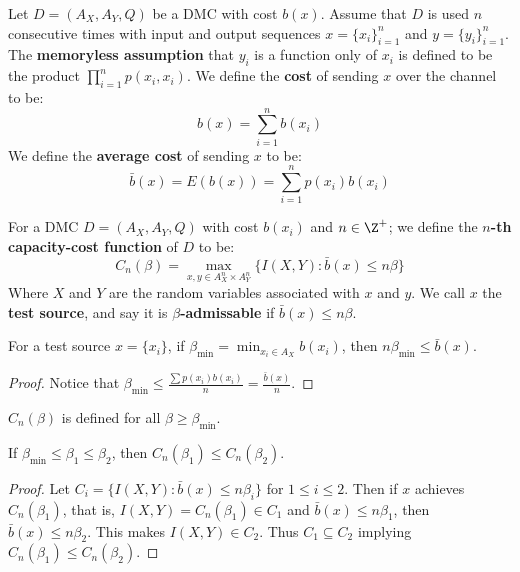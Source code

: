 \begin{definition}
    Let $D=(A_X,A_Y,Q)$ be a DMC with cost $b(x)$. Assume that $D$ is used  $n$
    consecutive times with input and output sequences  $x=\{x_i\}_{i=1}^n$ and
    $y=\{y_i\}_{i=1}^n$. The \textbf{memoryless assumption} that $y_i$ is a
    function only of  $x_i$ is defined to be the product
    $\prod_{i=1}^n{p(x_i,x_i)}$. We define the \textbf{cost} of sending $x$ over
    the channel to  be:
    \begin{equation}
        b(x)=\sum_{i=1}^n{b(x_i)}
    \end{equation}
    We define the \textbf{average cost} of sending $x$ to be:
    \begin{equation}
        \bar{b}(x)=E(b(x))=\sum_{i=1}^n{p(x_i)b(x_i)}
    \end{equation}
\end{definition}

\begin{definition}
    For a DMC $D=(A_X,A_Y,Q)$ with cost $b(x_i)$ and $n \in \Z^+$; we define the
     \textbf{$n$-th capacity-cost function} of $D$ to be:
     \begin{equation}
         C_n(\beta)=\max_{x,y \in A_X^n \times A_Y^n}{\{I(X,Y) : \bar{b}(x)\leq
         n\beta\}}
     \end{equation}
     Where $X$ and  $Y$ are the random variables associated with  $x$ and  $y$.
     We call $x$ the \textbf{test source}, and say it is
     \textbf{$\beta$-admissable} if $\bar{b}(x) \leq n\beta$.
\end{definition}

\begin{lemma}\label{3.1.1}
    For a test source $x=\{x_i\}$, if $\beta_{\min}=\min_{x_i \in A_X}{b(x_i)}$,
    then $n\beta_{\min} \leq \bar{b}(x)$.
\end{lemma}
\begin{proof}
    Notice that $\beta_{\min} \leq
    \frac{\sum{p(x_i)b(x_i)}}{n}=\frac{\bar{b}(x)}{n}$.
\end{proof}
\begin{corollary}
    $C_n(\beta)$ is defined for all $\beta \geq \beta_{\min}$.
\end{corollary}
\begin{corollary}
    If $\beta_{\min} \leq \beta_1 \leq \beta_2$, then $C_n(\beta_1) \leq
    C_n(\beta_2)$.
\end{corollary}
\begin{proof}
    Let $C_i=\{I(X,Y) : \bar{b}(x) \leq n\beta_i\}$ for $1 \leq i \leq 2$. Then
    if $x$ achieves  $C_n(\beta_1)$, that is, $I(X,Y)=C_n(\beta_1) \in C_1$ and
    $\bar{b}(x) \leq n\beta_1$, then $\bar{b}(x) \leq n\beta_2$. This makes
    $I(X,Y) \in C_2$. Thus $C_1 \subseteq C_2$ implying $C_n(\beta_1) \leq
    C_n(\beta_2)$.
\end{proof}

